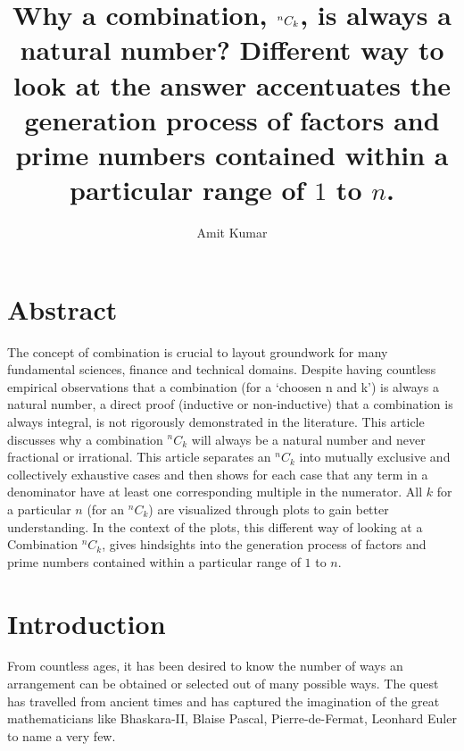 \documentclass[10pt, twoside]{article}
\title{Why a combination, $\Combination{n}{k}$, is always a natural number? Different way to look at the answer accentuates the generation process of factors and prime numbers contained within a particular range of $1$ to $n$.}
\author{Amit Kumar}
\date{}
\newcommand*{\Combination}[2]{{}^{#1}C_{#2}}%
\begin{document}
	\maketitle
	\section{Abstract}
	 The concept of combination is crucial to layout groundwork for many fundamental sciences, finance and technical domains. Despite having countless empirical observations that a combination (for a `choosen n and k') is always a natural number, a direct proof (inductive or non-inductive) that a combination is always integral, is not rigorously demonstrated in the literature. This article discusses why a combination $\Combination{n}{k}$ will always be a natural number and never fractional or irrational. This article separates an $\Combination{n}{k}$ into mutually exclusive and collectively exhaustive cases and then shows for each case that any term in a denominator have at least one corresponding multiple in the numerator. All $k$ for a particular $n$ (for an $\Combination{n}{k}$) are visualized through plots to gain better understanding. In the context of the plots, this different way of looking at a Combination $\Combination{n}{k}$, gives hindsights into the generation process of factors and prime numbers contained within a particular range of $1$ to $n$.
	\section{Introduction}
	From countless ages, it has been desired to know the number of ways an arrangement can be obtained or selected out of many possible ways. The quest has travelled from ancient times and has captured the imagination of the great mathematicians like Bhaskara-II\cite{wikipediaCombinatorics}, Blaise Pascal\cite{wikipediaPascal}, Pierre-de-Fermat\cite{wikipediaFermat}, Leonhard Euler\cite{wikipediaEuler} to name a very few.
\end{document}
